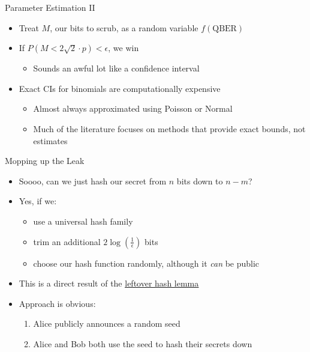 \documentclass[pdf]{beamer}
\begin{document}
\begin{frame}{Parameter Estimation II}
  \begin{itemize}
  \item Treat $M$, our bits to scrub, as a random variable $f(\text{QBER})$
  \pause\item If $P(M < 2\sqrt{2} \cdot p) < \epsilon$, we win
    \begin{itemize}
    \item Sounds an awful lot like a confidence interval
    \end{itemize}
  \pause\item Exact CIs for binomials are computationally expensive
    \begin{itemize}
    \item Almost always approximated using Poisson or Normal
    \item Much of the literature focuses on methods that provide exact bounds,
      not estimates
    \end{itemize}
  \end{itemize}
\end{frame}
\begin{frame}{Mopping up the Leak}
  \begin{itemize}
  \item Soooo, can we just hash our secret from $n$ bits down to $n-m$?
  \pause\item Yes, if we:
    \begin{itemize}
    \item use a universal hash family
    \item trim an additional $2 \log \left( \frac{1}{\epsilon} \right)$ bits
    \item choose our hash function randomly, although it \emph{can} be public
    \end{itemize}
  \pause\item This is a direct result of the
    \underline{\href{https://www.cs.bu.edu/~reyzin/teaching/s11cs937/notes-leo-1.pdf}{leftover
        hash lemma}}
  \pause\item Approach is obvious:
    \begin{enumerate}
    \item Alice publicly announces a random seed
    \item Alice and Bob both use the seed to hash their secrets down
    \end{enumerate}
  \end{itemize}
\end{frame}
\end{document}
